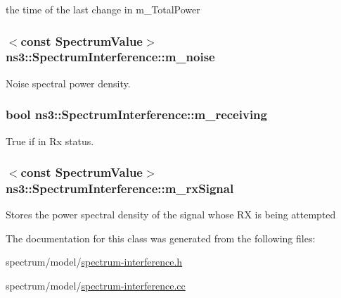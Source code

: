 the time of the last change in m\+\_\+\+Total\+Power 

\subsubsection[{\texorpdfstring{m\+\_\+noise}{m_noise}}]{$<$const {\bf Spectrum\+Value}$>$ ns3\+::\+Spectrum\+Interference\+::m\+\_\+noise\hspace{0.3cm}{\ttfamily [private]}}\hypertarget{classns3_1_1SpectrumInterference_a60dbe61438ba4d4b5eb2a5aa2a8f150a}{}\label{classns3_1_1SpectrumInterference_a60dbe61438ba4d4b5eb2a5aa2a8f150a}


Noise spectral power density. 

\subsubsection[{\texorpdfstring{m\+\_\+receiving}{m_receiving}}]{\setlength{\rightskip}{0pt plus 5cm}bool ns3\+::\+Spectrum\+Interference\+::m\+\_\+receiving\hspace{0.3cm}{\ttfamily [private]}}\hypertarget{classns3_1_1SpectrumInterference_a5a10048a40d64f8502c8eecc7110bb13}{}\label{classns3_1_1SpectrumInterference_a5a10048a40d64f8502c8eecc7110bb13}


True if in Rx status. 

\subsubsection[{\texorpdfstring{m\+\_\+rx\+Signal}{m_rxSignal}}]{$<$const {\bf Spectrum\+Value}$>$ ns3\+::\+Spectrum\+Interference\+::m\+\_\+rx\+Signal\hspace{0.3cm}{\ttfamily [private]}}\hypertarget{classns3_1_1SpectrumInterference_aff6a566f35e280048bb970e5975b117e}{}\label{classns3_1_1SpectrumInterference_aff6a566f35e280048bb970e5975b117e}
Stores the power spectral density of the signal whose RX is being attempted 

The documentation for this class was generated from the following files\+:\begin{DoxyCompactItemize}
\item 
spectrum/model/\hyperlink{spectrum-interference_8h}{spectrum-\/interference.\+h}\item 
spectrum/model/\hyperlink{spectrum-interference_8cc}{spectrum-\/interference.\+cc}\end{DoxyCompactItemize}
